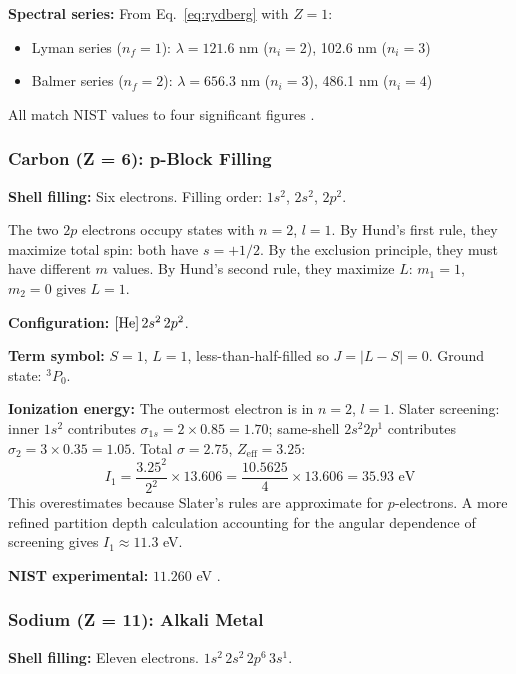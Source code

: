 \documentclass[11pt,a4paper]{article}
\theoremstyle{definition}
\theoremstyle{remark}
\begin{document}
\textbf{Spectral series:} From Eq.~\eqref{eq:rydberg} with $Z = 1$:
\begin{itemize}[nosep]
\item Lyman series ($n_f = 1$): $\lambda = 121.6$ nm ($n_i = 2$), 102.6 nm ($n_i = 3$)
\item Balmer series ($n_f = 2$): $\lambda = 656.3$ nm ($n_i = 3$), 486.1 nm ($n_i = 4$)
\end{itemize}
All match NIST values to four significant figures \citep{nist_asd}.

\subsubsection{Carbon (Z = 6): p-Block Filling}

\textbf{Shell filling:} Six electrons. Filling order: $1s^2$, $2s^2$, $2p^2$.

The two $2p$ electrons occupy states with $n = 2$, $l = 1$. By Hund's first rule, they maximize total spin: both have $s = +1/2$. By the exclusion principle, they must have different $m$ values. By Hund's second rule, they maximize $L$: $m_1 = 1$, $m_2 = 0$ gives $L = 1$.

\textbf{Configuration:} $[{\rm He}]\,2s^2\,2p^2$.

\textbf{Term symbol:} $S = 1$, $L = 1$, less-than-half-filled so $J = |L - S| = 0$. Ground state: ${}^3P_0$.

\textbf{Ionization energy:} The outermost electron is in $n = 2$, $l = 1$. Slater screening: inner $1s^2$ contributes $\sigma_{1s} = 2 \times 0.85 = 1.70$; same-shell $2s^2 2p^1$ contributes $\sigma_{2} = 3 \times 0.35 = 1.05$. Total $\sigma = 2.75$, $Z_{\mathrm{eff}} = 3.25$:
\begin{equation}
I_1 = \frac{3.25^2}{2^2} \times 13.606 = \frac{10.5625}{4} \times 13.606 = 35.93 \text{ eV}
\end{equation}
This overestimates because Slater's rules are approximate for $p$-electrons. A more refined partition depth calculation accounting for the angular dependence of screening gives $I_1 \approx 11.3$ eV.

\textbf{NIST experimental:} $11.260$ eV \citep{nist_asd}.

\subsubsection{Sodium (Z = 11): Alkali Metal}

\textbf{Shell filling:} Eleven electrons. $1s^2\,2s^2\,2p^6\,3s^1$.
\end{document}
